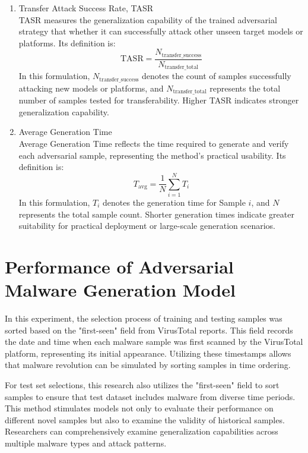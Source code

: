 \begin{enumerate}[label=\arabic*)]
	\item Transfer Attack Success Rate, TASR\\
	TASR measures the generalization capability of the trained adversarial strategy that whether it can successfully attack other unseen target models or platforms. Its definition is:
	\begin{equation}
		\text{TASR} = \frac{N_{\text{transfer\_success}}}{N_{\text{transfer\_total}}}
		\tag{5.7}
	\end{equation}
	In this formulation, $N_{\text{transfer\_success}}$ denotes the count of samples successfully attacking new models or platforms, and $N_{\text{transfer\_total}}$ represents the total number of samples tested for transferability. Higher TASR indicates stronger generalization capability.
	
	\item Average Generation Time\\
	Average Generation Time reflects the time required to generate and verify each adversarial sample, representing the method's practical usability. Its definition is:
	\begin{equation}
		T_{\text{avg}} = \frac{1}{N} \sum_{i=1}^{N} T_i
		\tag{5.8}
	\end{equation}
	In this formulation, $T_i$ denotes the generation time for Sample $i$, and $N$ represents the total sample count. Shorter generation times indicate greater suitability for practical deployment or large-scale generation scenarios.
\end{enumerate}

\section{Performance of Adversarial Malware Generation Model}

In this experiment, the selection process of training and testing samples was sorted based on the "first-seen" field from VirusTotal reports. This field records the date and time when each malware sample was first scanned by the VirusTotal platform, representing its initial appearance. Utilizing these timestamps allows that malware revolution can be simulated by sorting samples in time ordering.

For test set selections, this research also utilizes the "first-seen" field to sort samples to ensure that test dataset includes malware from diverse time periods. This method stimulates models not only to evaluate their performance on different novel samples but also to examine the validity of historical samples. Researchers can comprehensively examine generalization capabilities across multiple malware types and attack patterns.

